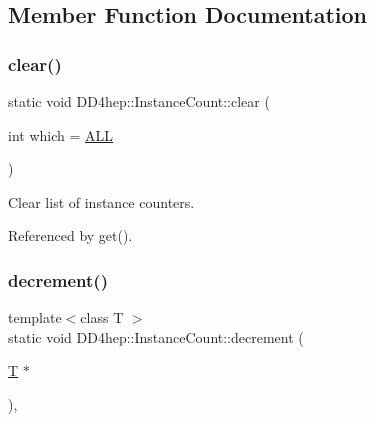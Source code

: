 \subsection{Member Function Documentation}
\hypertarget{struct_d_d4hep_1_1_instance_count_a94bb311b134800236d5be147df616072}{}\label{struct_d_d4hep_1_1_instance_count_a94bb311b134800236d5be147df616072} 
\subsubsection{\texorpdfstring{clear()}{clear()}}
{\footnotesize\ttfamily static void D\+D4hep\+::\+Instance\+Count\+::clear (\begin{DoxyParamCaption}\item[{int}]{which = {\ttfamily \hyperlink{struct_d_d4hep_1_1_instance_count_ae1ac289e30ac5ae83640ae2ed97f947ca948324c1e49c9a310b45c9f681b381a8}{A\+LL}} }\end{DoxyParamCaption})\hspace{0.3cm}{\ttfamily [static]}}



Clear list of instance counters. 



Referenced by get().

\hypertarget{struct_d_d4hep_1_1_instance_count_a5053617b5c5083ea3b7d8f306c9a3933}{}\label{struct_d_d4hep_1_1_instance_count_a5053617b5c5083ea3b7d8f306c9a3933} 
\subsubsection{\texorpdfstring{decrement()}{decrement()}\hspace{0.1cm}{\footnotesize\ttfamily [1/3]}}
{\footnotesize\ttfamily template$<$class T $>$ \\
static void D\+D4hep\+::\+Instance\+Count\+::decrement (\begin{DoxyParamCaption}\item[{\hyperlink{class_t}{T} $\ast$}]{ }\end{DoxyParamCaption})\hspace{0.3cm}{\ttfamily [inline]}, {\ttfamily [static]}}



